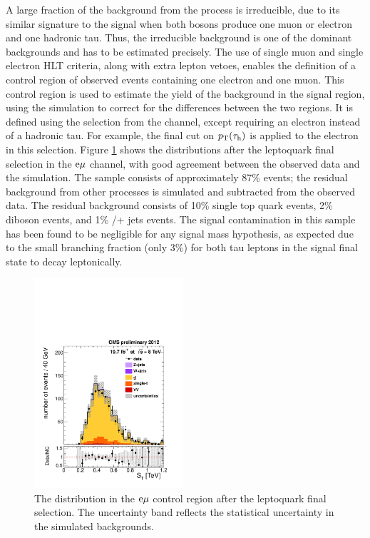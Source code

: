 A large fraction of the background from the \ttbar process is irreducible, due to its similar signature to the signal when both \W bosons produce one muon or electron and one hadronic tau. Thus, the \ttbar irreducible background is one of the dominant backgrounds and has to be estimated precisely. The use of single muon and single electron HLT criteria, along with extra lepton vetoes, enables the definition of a control region of observed events containing one electron and one muon. This \emu control region is used to estimate the yield of the \ttbar background in the signal region, using the simulation to correct for the differences between the two regions. It is defined using the selection from the \mutau channel, except requiring an electron instead of a hadronic tau. For example, the final cut on $p_{\mathrm{T}}(\tau_{\text{h}})$ is applied to the electron in this selection. Figure \ref{fig:ttCC} shows the \ST distributions after the leptoquark final selection in the $\mathrm{e}\mu$ channel, with good agreement between the observed data and the simulation. The \emu sample consists of approximately 87\% \ttbar events; the residual background from other processes is simulated and subtracted from the observed data. The residual background consists of 10\% single top quark events, 2\% diboson events, and 1\% \W/\Z + jets events. The signal contamination in this sample has been found to be negligible for any signal mass hypothesis, as expected due to the small branching fraction (only 3\%) for both tau leptons in the signal final state to decay leptonically.

\begin{figure}[hbt]
  \begin{center}
    \includegraphics[width=0.49\textwidth]{figures/bkgEstim/STbjetFinalEMu.pdf}
    \caption{The \ST distribution in the $\mathrm{e}\mu$ control region after the leptoquark final selection. The uncertainty band reflects the statistical uncertainty in the simulated backgrounds.}
    \label{fig:ttCC}
  \end{center}
\end{figure}



